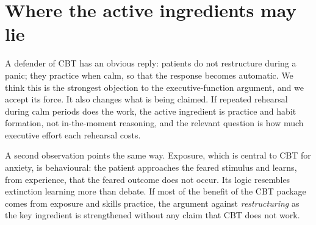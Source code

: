 \section{Where the active ingredients may lie}\label{sec:ingredients}
A defender of CBT has an obvious reply: patients do not restructure during a panic; they practice when calm, so that the response becomes automatic. We think this is the strongest objection to the executive-function argument, and we accept its force. It also changes what is being claimed. If repeated rehearsal during calm periods does the work, the active ingredient is practice and habit formation, not in-the-moment reasoning, and the relevant question is how much executive effort each rehearsal costs.

A second observation points the same way. Exposure, which is central to CBT for anxiety, is behavioural: the patient approaches the feared stimulus and learns, from experience, that the feared outcome does not occur. Its logic resembles extinction learning more than debate. If most of the benefit of the CBT package comes from exposure and skills practice, the argument against \emph{restructuring} as the key ingredient is strengthened without any claim that CBT does not work.

